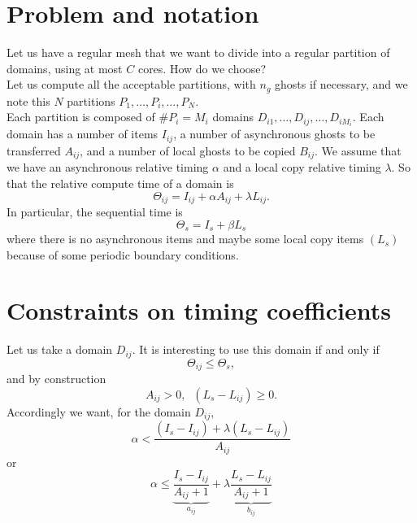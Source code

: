 \documentclass[aps,onecolumn,11pt]{revtex4}
\begin{document}
\section{Problem and notation}
Let us have a regular mesh that we want to divide into a regular partition of domains, using at most $C$ cores.
How do we choose?\\
Let us compute all the acceptable partitions, with $n_g$ ghosts if necessary, and we note this $N$ partitions 
$P_1,\ldots,P_i,\ldots,P_N$.\\
Each partition is composed of $\#P_i=M_i$ domains $D_{i1},\ldots,D_{ij},\ldots,D_{iM_i}$.
Each domain has a number of items $I_{ij}$, a number of asynchronous ghosts to be transferred $A_{ij}$, 
and a number of local ghosts to be copied $B_{ij}$. We assume that we have an asynchronous relative
timing $\alpha$ and a local copy relative timing $\lambda$.
So that the relative compute time of a domain is
$$
	\Theta_{ij} = I_{ij} + \alpha A_{ij} + \lambda L_{ij}.
$$
In particular, the sequential time is
$$
	\Theta_{s} = I_s + \beta L_s
$$
where there is no asynchronous items and maybe some local copy items $(L_s)$ because of some periodic boundary conditions.


\section{Constraints on timing coefficients}
Let us take a domain $D_{ij}$. It is interesting to use this domain if and only if
$$
	\Theta_{ij} \leq \Theta_s,
$$
and by construction
$$
	A_{ij}>0, \;\; \left(L_s-L_{ij}\right) \geq 0.
$$
Accordingly we want, for the domain $D_{ij}$,
$$
\alpha < \dfrac{\left(I_s-I_{ij}\right) + \lambda \left(L_s-L_{ij}\right)}{A_{ij}}
$$
or
$$
	\alpha \leq \underbrace{\dfrac{I_s-I_{ij}}{A_{ij}+1}}_{a_{ij}} + \lambda 
	\underbrace{\dfrac{L_s-L_{ij}}{A_{ij}+1}}_{b_{ij}}
$$
\end{document}
